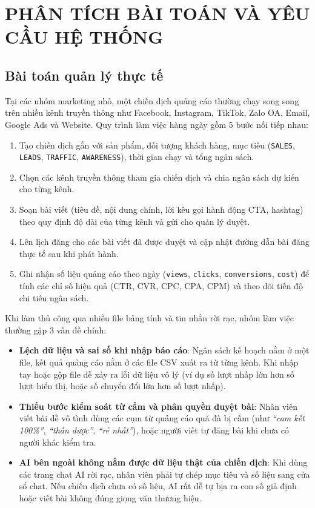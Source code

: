 \chapter{PHÂN TÍCH BÀI TOÁN VÀ YÊU CẦU HỆ THỐNG}

\section{Bài toán quản lý thực tế}

Tại các nhóm marketing nhỏ, một chiến dịch quảng cáo thường chạy song song trên nhiều kênh truyền thông như Facebook, Instagram, TikTok, Zalo OA, Email, Google Ads và Website. Quy trình làm việc hàng ngày gồm 5 bước nối tiếp nhau:
\begin{enumerate}[noitemsep,topsep=2pt]
 \item Tạo chiến dịch gắn với sản phẩm, đối tượng khách hàng, mục tiêu (\texttt{SALES}, \texttt{LEADS}, \texttt{TRAFFIC}, \texttt{AWARENESS}), thời gian chạy và tổng ngân sách.
 \item Chọn các kênh truyền thông tham gia chiến dịch và chia ngân sách dự kiến cho từng kênh.
 \item Soạn bài viết (tiêu đề, nội dung chính, lời kêu gọi hành động CTA, hashtag) theo quy định độ dài của từng kênh và gửi cho quản lý duyệt.
 \item Lên lịch đăng cho các bài viết đã được duyệt và cập nhật đường dẫn bài đăng thực tế sau khi phát hành.
 \item Ghi nhận số liệu quảng cáo theo ngày (\texttt{views}, \texttt{clicks}, \texttt{conversions}, \texttt{cost}) để tính các chỉ số hiệu quả (CTR, CVR, CPC, CPA, CPM) và theo dõi tiến độ chi tiêu ngân sách.
\end{enumerate}

Khi làm thủ công qua nhiều file bảng tính và tin nhắn rời rạc, nhóm làm việc thường gặp 3 vấn đề chính:
\begin{itemize}[noitemsep,topsep=2pt]
 \item \textbf{Lệch dữ liệu và sai số khi nhập báo cáo}: Ngân sách kế hoạch nằm ở một file, kết quả quảng cáo nằm ở các file CSV xuất ra từ từng kênh. Khi nhập tay hoặc gộp file dễ xảy ra lỗi dữ liệu vô lý (ví dụ số lượt nhấp lớn hơn số lượt hiển thị, hoặc số chuyển đổi lớn hơn số lượt nhấp).
 \item \textbf{Thiếu bước kiểm soát từ cấm và phân quyền duyệt bài}: Nhân viên viết bài dễ vô tình dùng các cụm từ quảng cáo quá đà bị cấm (như \textit{``cam kết 100\%''}, \textit{``thần dược''}, \textit{``rẻ nhất''}), hoặc người viết tự đăng bài khi chưa có người khác kiểm tra.
 \item \textbf{AI bên ngoài không nắm được dữ liệu thật của chiến dịch}: Khi dùng các trang chat AI rời rạc, nhân viên phải tự chép mục tiêu và số liệu sang cửa sổ chat. Nếu chiến dịch chưa có số liệu, AI rất dễ tự bịa ra con số giả định hoặc viết bài không đúng giọng văn thương hiệu.
\end{itemize}

